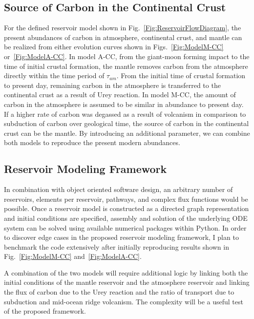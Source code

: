 \subsection{Source of Carbon in the Continental Crust}
For the defined reservoir model shown in Fig.~\ref{Fig:ReservoirFlowDiagram}, the present abundances of carbon in atmosphere, continental crust, and mantle can be realized from either evolution curves shown in Figs.~\ref{Fig:ModelM-CC} or~\ref{Fig:ModelA-CC}. In model A-CC, from the giant-moon forming impact to the time of initial crustal formation, the mantle removes carbon from the atmosphere directly within the time period of $\tau_{am}$. From the initial time of crustal formation to present day, remaining carbon in the atmosphere is transferred to the continental crust as a result of Urey reaction. In model M-CC, the amount of carbon in the atmosphere is assumed to be similar in abundance to present day. If a higher rate of carbon was degassed as a result of volcanism in comparison to subduction of carbon over geological time, the source of carbon in the continental crust can be the mantle. By introducing an additional parameter, we can combine both models to reproduce the present modern abundances.

\subsection{Reservoir Modeling Framework}
In combination with object oriented software design, an arbitrary number of reservoirs, elements per reservoir, pathways, and complex flux functions would be possible. Once a reservoir model is constructed as a directed graph representation and initial conditions are specified, assembly and solution of the underlying ODE system can be solved using available numerical packages within Python. In order to discover edge cases in the proposed reservoir modeling framework, I plan to benchmark the code extensively after initially  reproducing results shown in Fig.~\ref{Fig:ModelM-CC} and~\ref{Fig:ModelA-CC}. 

A combination of the two models will require additional logic by linking both the initial conditions of the mantle reservoir and the atmosphere reservoir and linking the flux of carbon due to the Urey reaction and the ratio of transport due to subduction and mid-ocean ridge volcanism. The complexity will be a useful test of the proposed framework. 


